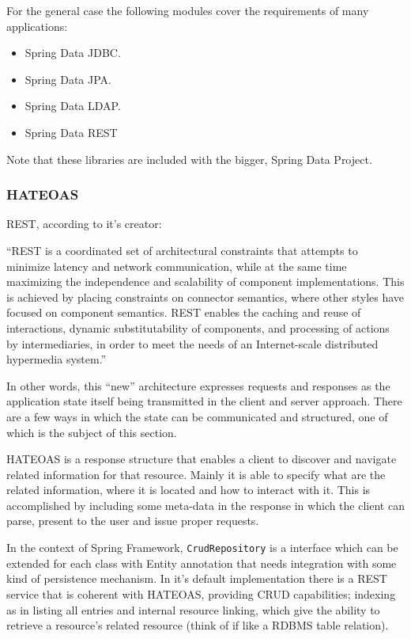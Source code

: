 For the general case the following modules cover the requirements of many applications:
\begin{itemize}
\item Spring Data \gls{JDBC}.
\item Spring Data \gls{JPA}.
\item Spring Data \gls{LDAP}.
\item Spring Data \gls{REST}
\end{itemize}
Note that these libraries are included with the bigger, Spring Data Project.

\subsubsection{\gls{HATEOAS}}
\gls{REST}, according to it's creator:

\begin{displayquote}
  ``REST is a coordinated set of architectural constraints that attempts to minimize latency and network communication, while at the same time maximizing the independence and scalability of component implementations. This is achieved  by  placing  constraints  on  connector  semantics,  where  other  styles have focused on component semantics. REST enables the caching and reuse of interactions, dynamic substitutability of components, and processing of actions by intermediaries, in order to meet the needs of an Internet-scale distributed hypermedia system.''~\cite{fielding}
\end{displayquote}

In other words, this ``new'' architecture expresses requests and responses as the application state itself being transmitted in the client and server approach. There are a few ways in which the state can be communicated and structured, one of which is the subject of this section. 

\gls{HATEOAS} is a response structure that enables a client to discover and navigate related information for that resource\cite{fielding}. Mainly it is able to specify what are the related information, where it is located and how to interact with it. This is accomplished by including some meta-data in the response in which the client can parse, present to the user and issue proper requests.

In the context of Spring Framework, \texttt{CrudRepository} is a interface which can be extended for each class with Entity annotation that needs integration with some kind of persistence mechanism. In it's default implementation there is a \gls{REST} service that is coherent with \gls{HATEOAS}, providing \gls{CRUD} capabilities; indexing as in listing all entries and internal resource linking, which give the ability to retrieve a resource's related resource (think of if like a \gls{RDBMS} table relation).

